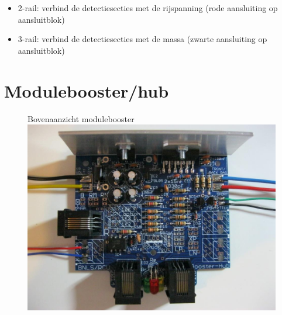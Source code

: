 \documentclass[12pt,a4paper]{report}
\begin{document}
\begin{itemize}
\item 2-rail: verbind de detectiesecties met de rijspanning (rode aansluiting op aansluitblok)
\item 3-rail: verbind de detectiesecties met de massa (zwarte aansluiting op aansluitblok)
\end{itemize}

\section{Modulebooster/hub}

\begin{figure}[h]
  \captionbox
  {Bovenaanzicht modulebooster\label{modulebooster}}
  {\includegraphics[scale=0.5]{images/rcu_foto3}\\}
\end{figure}
\end{document}

